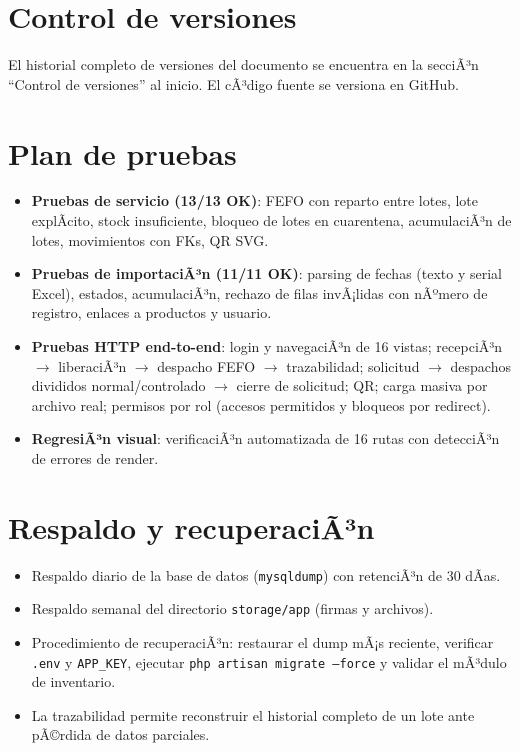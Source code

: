 ﻿\documentclass[a4paper, 12pt]{article}
\begin{document}
\section{Control de versiones}
El historial completo de versiones del documento se encuentra en la secciÃ³n ``Control de versiones'' al inicio. El cÃ³digo fuente se versiona en GitHub.

\section{Plan de pruebas}
\begin{itemize}
    \item \textbf{Pruebas de servicio (13/13 OK)}: FEFO con reparto entre lotes, lote explÃ­cito, stock insuficiente, bloqueo de lotes en cuarentena, acumulaciÃ³n de lotes, movimientos con FKs, QR SVG.
    \item \textbf{Pruebas de importaciÃ³n (11/11 OK)}: parsing de fechas (texto y serial Excel), estados, acumulaciÃ³n, rechazo de filas invÃ¡lidas con nÃºmero de registro, enlaces a productos y usuario.
    \item \textbf{Pruebas HTTP end-to-end}: login y navegaciÃ³n de 16 vistas; recepciÃ³n $\to$ liberaciÃ³n $\to$ despacho FEFO $\to$ trazabilidad; solicitud $\to$ despachos divididos normal/controlado $\to$ cierre de solicitud; QR; carga masiva por archivo real; permisos por rol (accesos permitidos y bloqueos por redirect).
    \item \textbf{RegresiÃ³n visual}: verificaciÃ³n automatizada de 16 rutas con detecciÃ³n de errores de render.
\end{itemize}

\section{Respaldo y recuperaciÃ³n}
\begin{itemize}
    \item Respaldo diario de la base de datos (\texttt{mysqldump}) con retenciÃ³n de 30 dÃ­as.
    \item Respaldo semanal del directorio \texttt{storage/app} (firmas y archivos).
    \item Procedimiento de recuperaciÃ³n: restaurar el dump mÃ¡s reciente, verificar \texttt{.env} y \texttt{APP\_KEY}, ejecutar \texttt{php artisan migrate --force} y validar el mÃ³dulo de inventario.
    \item La trazabilidad permite reconstruir el historial completo de un lote ante pÃ©rdida de datos parciales.
\end{itemize}
\end{document}
